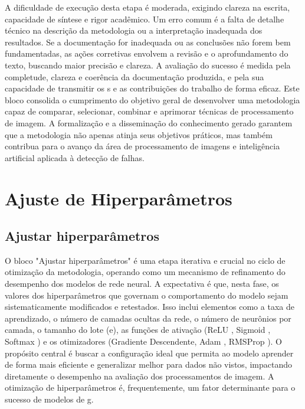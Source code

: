 A dificuldade de execução desta etapa é moderada, exigindo clareza na escrita, capacidade de síntese e rigor acadêmico. Um erro comum é a falta de detalhe técnico na descrição da metodologia ou a interpretação inadequada dos resultados. Se a documentação for inadequada ou as conclusões não forem bem fundamentadas, as ações corretivas envolvem a revisão e o aprofundamento do texto, buscando maior precisão e clareza. A avaliação do sucesso é medida pela completude, clareza e coerência da documentação produzida, e pela sua capacidade de transmitir os s e as contribuições do trabalho de forma eficaz. Este bloco consolida o cumprimento do objetivo geral de desenvolver uma metodologia capaz de comparar, selecionar, combinar e aprimorar técnicas de processamento de imagem. A formalização e a disseminação do conhecimento gerado garantem que a metodologia não apenas atinja seus objetivos práticos, mas também contribua para o avanço da área de processamento de imagens e inteligência artificial aplicada à detecção de falhas.

\section{Ajuste de Hiperparâmetros}

\subsection{Ajustar hiperparâmetros}
O bloco "Ajustar hiperparâmetros" é uma etapa iterativa e crucial no ciclo de otimização da metodologia, operando como um mecanismo de refinamento do desempenho dos modelos de rede neural. A expectativa é que, nesta fase, os valores dos hiperparâmetros que governam o comportamento do modelo sejam sistematicamente modificados e retestados. Isso inclui elementos como a taxa de aprendizado, o número de camadas ocultas da rede, o número de neurônios por camada, o tamanho do lote (e), as funções de ativação (ReLU \cite{Agarap2018}, Sigmoid \cite{Langer2020}, Softmax \cite{Gao2017}) e os otimizadores (Gradiente Descendente, Adam \cite{Kingma2014}, RMSProp \cite{Tieleman2012}). O propósito central é buscar a configuração ideal que permita ao modelo aprender de forma mais eficiente e generalizar melhor para dados não vistos, impactando diretamente o desempenho na avaliação dos processamentos de imagem. A otimização de hiperparâmetros é, frequentemente, um fator determinante para o sucesso de modelos de g.

